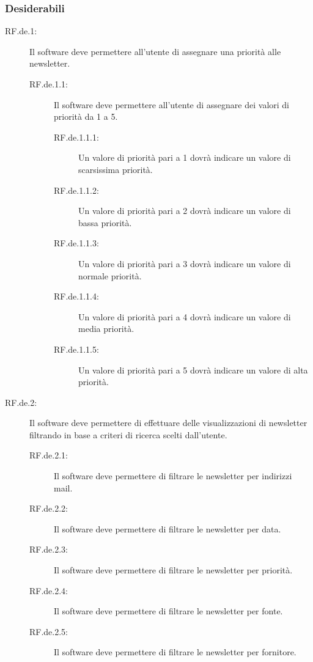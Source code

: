 \subsubsection{Desiderabili}

\begin{description}
\item[RF.de.1:] Il software deve permettere all\textquoteright{}utente di assegnare una priorit\`{a} alle newsletter.
\begin{description}
\item[RF.de.1.1:] Il software deve permettere all\textquoteright{}utente di assegnare dei valori di priorit\`{a} da 1 a 5.
\begin{description}
\item[RF.de.1.1.1:] Un valore di priorit\`{a} pari a 1 dovr\`{a} indicare un valore di scarsissima priorit\`{a}.
\item[RF.de.1.1.2:] Un valore di priorit\`{a} pari a 2 dovr\`{a} indicare un valore di bassa priorit\`{a}.
\item[RF.de.1.1.3:] Un valore di priorit\`{a} pari a 3 dovr\`{a} indicare un valore di normale priorit\`{a}.
\item[RF.de.1.1.4:] Un valore di priorit\`{a} pari a 4 dovr\`{a} indicare un valore di media priorit\`{a}.
\item[RF.de.1.1.5:] Un valore di priorit\`{a} pari a 5 dovr\`{a} indicare un valore di alta priorit\`{a}.
\end{description}
\end{description}
\item[RF.de.2:] Il software deve permettere di effettuare delle visualizzazioni di newsletter filtrando in base a criteri di ricerca scelti dall\textquoteright{}utente.
\begin{description}
\item[RF.de.2.1:] Il software deve permettere di filtrare le newsletter per indirizzi mail.
\item[RF.de.2.2:] Il software deve permettere di filtrare le newsletter per data.
\item[RF.de.2.3:] Il software deve permettere di filtrare le newsletter per priorit\`{a}.
\item[RF.de.2.4:] Il software deve permettere di filtrare le newsletter per fonte.
\item[RF.de.2.5:] Il software deve permettere di filtrare le newsletter per fornitore.
\end{description}
\end{description}
 
